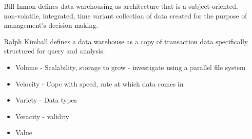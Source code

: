 Bill Inmon defines data warehousing as architecture that is a subject-oriented, non-volatile, integrated, time variant collection of data created for the purpose of management’s decision making. 

Ralph Kimball defines a data warehouse as a copy of transaction data specifically structured for query and analysis.
\begin{itemize}
	\item Volume - Scalability, storage to grow - investigate using a parallel file system
	\item Velocity - Cope with speed, rate at which data comes in
	\item Variety - Data types
	\item Veracity - validity
	\item Value
\end{itemize}

